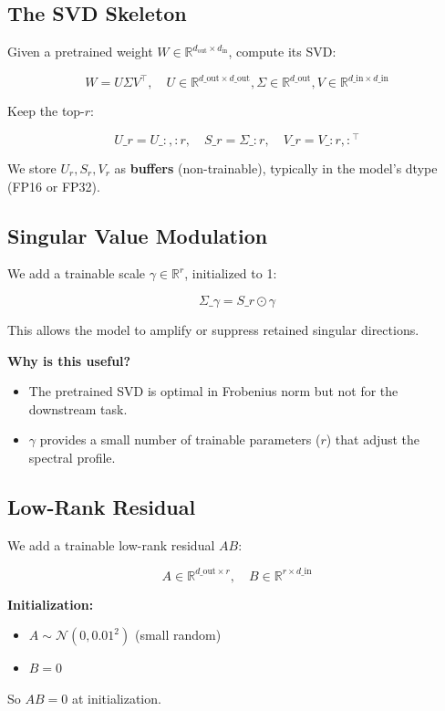 \subsection{The SVD Skeleton}

Given a pretrained weight $W \in \mathbb{R}^{d_\text{out} \times d_\text{in}}$, 
compute its SVD:

\[
W = U \Sigma V^\top, \quad U \in \mathbb{R}^{d\_\text{out} \times d\_\text{out}}, 
\Sigma \in \mathbb{R}^{d\_\text{out}}, V \in \mathbb{R}^{d\_\text{in} \times d\_\text{in}}
\tag{4.1}
\]

Keep the top-$r$:

\[
U\_r = U\_{:, :r}, \quad S\_r = \Sigma\_{:r}, \quad V\_r = V\_{:r, :}^\top
\tag{4.2}
\]

We store $U_r, S_r, V_r$ as \textbf{buffers} (non-trainable), typically in the 
model's dtype (FP16 or FP32).

\subsection{Singular Value Modulation}

We add a trainable scale $\gamma \in \mathbb{R}^r$, initialized to 1:

\[
\Sigma\_\gamma = S\_r \odot \gamma
\tag{4.3}
\]

This allows the model to amplify or suppress retained singular directions.

\textbf{Why is this useful?}
\begin{itemize}
\item The pretrained SVD is optimal in Frobenius norm but not for the downstream
  task.
\item $\gamma$ provides a small number of trainable parameters ($r$) that adjust
  the spectral profile.

\end{itemize}
\subsection{Low-Rank Residual}

We add a trainable low-rank residual $AB$:

\[
A \in \mathbb{R}^{d\_\text{out} \times r}, \quad 
B \in \mathbb{R}^{r \times d\_\text{in}}
\tag{4.4}
\]

\textbf{Initialization:}
\begin{itemize}
\item $A \sim \mathcal{N}(0, 0.01^2)$ (small random)
\item $B = 0$

\end{itemize}
So $AB = 0$ at initialization.

